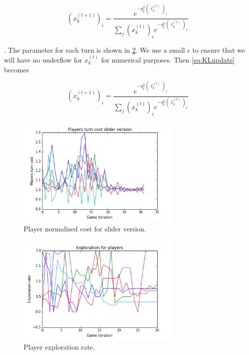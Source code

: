 \documentclass{sig-alternate-ipsn13}
\begin{document}
\begin{equation} \label{eq:KL_update}
  (x_k^{(t+1)})_i = \frac{e^{-\eta_t^k (\ell^{(t)}_k)_i}}{\sum_j (x_k^{(t)})_i e^{-\eta_t^k (\ell^{(t)}_k)_i}}
\end{equation}

. The parameter for each turn is shown in \ref{fig:exploration}. We use a small $\epsilon$ to ensure that we will have no underflow for $x_k^{(t)}$ for numerical purposes. Then \ref{eq:KLupdate} becomes

\begin{equation} \label{eq:KL_update_epsilon}
  (x_k^{(t+1)})_i = \frac{e^{-\eta_t^k (\ell^{(t)}_k)_i}}{\sum_j (x_k^{(t)})_i e^{-\eta_t^k (\ell^{(t)}_k)_i}}
\end{equation}


\begin{figure}
  \centering
  \includegraphics[width=80mm]{images/slider_players_costs.png}
  \caption{Player normalized cost for slider version.}
  \label{fig:cost_slider}
\end{figure}


\begin{figure}
  \centering
  \includegraphics[width=80mm]{images/players_learning_rate.png}
  \caption{Player exploration rate.}
  \label{fig:exploration}
\end{figure}




\end{document}
